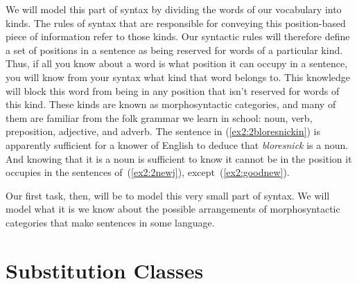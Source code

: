 We will model this part of syntax by dividing the words of our vocabulary into kinds. The rules of syntax that are responsible for conveying this position-based piece of information refer to those kinds. Our syntactic rules will therefore define a set of positions in a sentence as being reserved for words of a particular kind. Thus, if all you know about a word is what position it can occupy in a sentence, you will know from your syntax what kind that word belongs to. This knowledge will block this word from being in any position that isn't reserved for words of this kind. These kinds are known as morphosyntactic categories, and many of them are familiar from the folk grammar we learn in school: noun, verb, preposition, adjective, and adverb. The sentence in (\ref{ex2:2bloresnickin}) is apparently sufficient for a knower of English to deduce that \emph{bloresnick} is a noun. And knowing that it is a noun is sufficient to know it cannot be in the position it occupies in the sentences of~(\ref{ex2:2newj}), except~(\ref{ex2:goodnew}).

Our first task, then, will be to model this very small part of syntax. We will model what it is we know about the possible arrangements of morphosyntactic categories that make sentences in some language.

\section{Substitution Classes}


